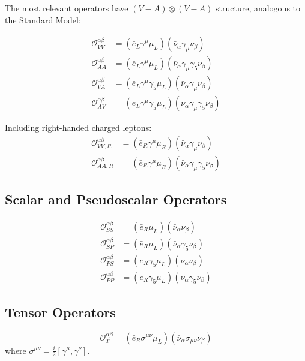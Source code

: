 \documentclass[11pt,a4paper]{article}
\begin{document}
The most relevant operators have $(V-A) \otimes (V-A)$ structure, analogous to the Standard Model:

\begin{align}
\mathcal{O}_{VV}^{\alpha\beta} &= (\bar{e}_L \gamma^\mu \mu_L)(\bar{\nu}_\alpha \gamma_\mu \nu_\beta) \\
\mathcal{O}_{AA}^{\alpha\beta} &= (\bar{e}_L \gamma^\mu \mu_L)(\bar{\nu}_\alpha \gamma_\mu \gamma_5 \nu_\beta) \\
\mathcal{O}_{VA}^{\alpha\beta} &= (\bar{e}_L \gamma^\mu \gamma_5 \mu_L)(\bar{\nu}_\alpha \gamma_\mu \nu_\beta) \\
\mathcal{O}_{AV}^{\alpha\beta} &= (\bar{e}_L \gamma^\mu \gamma_5 \mu_L)(\bar{\nu}_\alpha \gamma_\mu \gamma_5 \nu_\beta)
\end{align}

Including right-handed charged leptons:
\begin{align}
\mathcal{O}_{VV,R}^{\alpha\beta} &= (\bar{e}_R \gamma^\mu \mu_R)(\bar{\nu}_\alpha \gamma_\mu \nu_\beta) \\
\mathcal{O}_{AA,R}^{\alpha\beta} &= (\bar{e}_R \gamma^\mu \mu_R)(\bar{\nu}_\alpha \gamma_\mu \gamma_5 \nu_\beta)
\end{align}

\subsection{Scalar and Pseudoscalar Operators}

\begin{align}
\mathcal{O}_{SS}^{\alpha\beta} &= (\bar{e}_R \mu_L)(\bar{\nu}_\alpha \nu_\beta) \\
\mathcal{O}_{SP}^{\alpha\beta} &= (\bar{e}_R \mu_L)(\bar{\nu}_\alpha \gamma_5 \nu_\beta) \\
\mathcal{O}_{PS}^{\alpha\beta} &= (\bar{e}_R \gamma_5 \mu_L)(\bar{\nu}_\alpha \nu_\beta) \\
\mathcal{O}_{PP}^{\alpha\beta} &= (\bar{e}_R \gamma_5 \mu_L)(\bar{\nu}_\alpha \gamma_5 \nu_\beta)
\end{align}

\subsection{Tensor Operators}

\begin{equation}
\mathcal{O}_{T}^{\alpha\beta} = (\bar{e}_R \sigma^{\mu\nu} \mu_L)(\bar{\nu}_\alpha \sigma_{\mu\nu} \nu_\beta)
\end{equation}
where $\sigma^{\mu\nu} = \frac{i}{2}[\gamma^\mu, \gamma^\nu]$.
\end{document}
